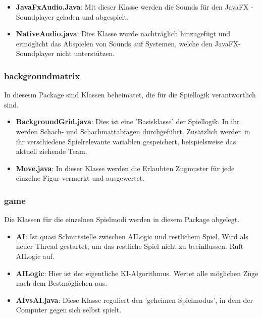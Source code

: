 \documentclass[12pt,a4paper]{article}
\begin{document}
{\begin{itemize}
	\item{\textbf{JavaFxAudio.Java}: Mit dieser Klasse werden die Sounds für den JavaFX - Soundplayer geladen und abgespielt. }	
	
	\item{\textbf{NativeAudio.java}: Dies Klasse wurde nachträglich hinzugefügt und ermöglicht das Abspielen von Sounds auf Systemen, welche den JavaFX-Soundplayer nicht unterstützen.}
	
\end{itemize}

\subsubsection{backgroundmatrix}

In diesesm Package sind Klassen beheimatet, die für die Spiellogik verantwortlich sind.

\begin{itemize}
	\item{\textbf{BackgroundGrid.java}: Dies ist eine 'Basisklasse' der Spiellogik. In ihr werden Schach- und Schachmattabfagen durchgeführt. Zusätzlich werden in ihr verschiedene Spielrelevante variablen gespeichert, beispielsweise das aktuell ziehende Team.}
	
	\item{\textbf{Move.java}: In dieser Klasse werden die Erlaubten Zugmuster für jede einzelne Figur vermerkt und ausgewertet.  }

\end{itemize}
 
\subsubsection{game}

Die Klassen für die einzelnen Spielmodi werden in diesem Package abgelegt. 


\begin{itemize}

	\item{\textbf{AI}: Ist quasi Schnittstelle zwischen AILogic und restlichem Spiel. Wird als neuer Thread gestartet, um das restliche Spiel nicht zu beeinflussen. Ruft AILogic auf.}
	
	\item{\textbf{AILogic}: Hier ist der eigentliche KI-Algorithmus. Wertet alle möglichen Züge nach dem Bestmöglichen aus.}

	\item{\textbf{AIvsAI.java}: Diese Klasse reguliert den 'geheimen Spielmodus', in dem der Computer gegen sich selbst spielt. }
	

\end{itemize}}
\end{document}
